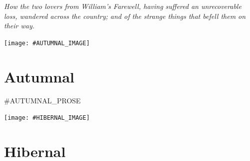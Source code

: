 \documentclass{amsbook}
\begin{document}
\thispagestyle{empty}
\vspace*{\fill}
 {\itshape How the two lovers from \emph{William's Farewell}, having suffered an unrecoverable loss, wandered across the country; and of the strange things that befell them on their way.}
\vspace*{\fill}
\clearpage

\thispagestyle{empty}
\vspace*{\fill}
{\centering
\texttt{[image: \#AUTUMNAL\_IMAGE]}}
\vspace*{\fill}
\clearpage

\mainmatter

\chapter{Autumnal}

\renewcommand{\poemone}{
\begin{figure}[p!]
\bigskip
\ding{72}
\bigskip
#AUTUMNAL_POEM_1
\end{figure}
}
\renewcommand{\poemtwo}{
\begin{figure}[p!]
\bigskip
\ding{72}
\bigskip
#AUTUMNAL_POEM_2
\end{figure}
}
\renewcommand{\poemthree}{
\begin{figure}[p!]
\bigskip
\ding{72}
\bigskip
#AUTUMNAL_POEM_3
\end{figure}
}
\initprintpoems

#AUTUMNAL_PROSE
\clearpage

\thispagestyle{empty}
\vspace*{\fill}
{\centering
\texttt{[image: \#HIBERNAL\_IMAGE]}}
\vspace*{\fill}
\clearpage

\chapter{Hibernal}

\renewcommand{\poemone}{
\begin{figure}[p!]
\bigskip
\ding{72}
\bigskip
#HIBERNAL_POEM_1
\end{figure}
}
\renewcommand{\poemtwo}{
\begin{figure}[p!]
\bigskip
\ding{72}
\bigskip
#HIBERNAL_POEM_2
\end{figure}
}
\renewcommand{\poemthree}{
\begin{figure}[p!]
\bigskip
\ding{72}
\bigskip
#HIBERNAL_POEM_3
\end{figure}
}
\initprintpoems
\end{document}
